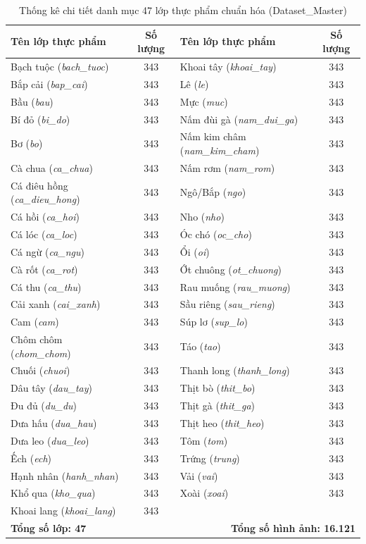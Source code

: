 \begin{table}[htbp]
\centering
\caption{Thống kê chi tiết danh mục 47 lớp thực phẩm chuẩn hóa (Dataset\_Master)}
\label{tab:dataset_distribution}
\footnotesize
\renewcommand{\arraystretch}{1.15}
\begin{tabularx}{\textwidth}{|X|c||X|c|}
\hline
\textbf{Tên lớp thực phẩm} & \textbf{Số lượng} & \textbf{Tên lớp thực phẩm} & \textbf{Số lượng} \\
\hline
Bạch tuộc (\textit{bach\_tuoc}) & 343 & Khoai tây (\textit{khoai\_tay}) & 343 \\
Bắp cải (\textit{bap\_cai}) & 343 & Lê (\textit{le}) & 343 \\
Bầu (\textit{bau}) & 343 & Mực (\textit{muc}) & 343 \\
Bí đỏ (\textit{bi\_do}) & 343 & Nấm đùi gà (\textit{nam\_dui\_ga}) & 343 \\
Bơ (\textit{bo}) & 343 & Nấm kim châm (\textit{nam\_kim\_cham}) & 343 \\
Cà chua (\textit{ca\_chua}) & 343 & Nấm rơm (\textit{nam\_rom}) & 343 \\
Cá điêu hồng (\textit{ca\_dieu\_hong}) & 343 & Ngô/Bắp (\textit{ngo}) & 343 \\
Cá hồi (\textit{ca\_hoi}) & 343 & Nho (\textit{nho}) & 343 \\
Cá lóc (\textit{ca\_loc}) & 343 & Óc chó (\textit{oc\_cho}) & 343 \\
Cá ngừ (\textit{ca\_ngu}) & 343 & Ổi (\textit{oi}) & 343 \\
Cà rốt (\textit{ca\_rot}) & 343 & Ớt chuông (\textit{ot\_chuong}) & 343 \\
Cá thu (\textit{ca\_thu}) & 343 & Rau muống (\textit{rau\_muong}) & 343 \\
Cải xanh (\textit{cai\_xanh}) & 343 & Sầu riêng (\textit{sau\_rieng}) & 343 \\
Cam (\textit{cam}) & 343 & Súp lơ (\textit{sup\_lo}) & 343 \\
Chôm chôm (\textit{chom\_chom}) & 343 & Táo (\textit{tao}) & 343 \\
Chuối (\textit{chuoi}) & 343 & Thanh long (\textit{thanh\_long}) & 343 \\
Dâu tây (\textit{dau\_tay}) & 343 & Thịt bò (\textit{thit\_bo}) & 343 \\
Đu đủ (\textit{du\_du}) & 343 & Thịt gà (\textit{thit\_ga}) & 343 \\
Dưa hấu (\textit{dua\_hau}) & 343 & Thịt heo (\textit{thit\_heo}) & 343 \\
Dưa leo (\textit{dua\_leo}) & 343 & Tôm (\textit{tom}) & 343 \\
Ếch (\textit{ech}) & 343 & Trứng (\textit{trung}) & 343 \\
Hạnh nhân (\textit{hanh\_nhan}) & 343 & Vải (\textit{vai}) & 343 \\
Khổ qua (\textit{kho\_qua}) & 343 & Xoài (\textit{xoai}) & 343 \\
Khoai lang (\textit{khoai\_lang}) & 343 & & \\
\hline
\multicolumn{2}{|l|}{\textbf{Tổng số lớp: 47}} & \multicolumn{2}{r|}{\textbf{Tổng số hình ảnh: 16.121}} \\
\hline
\end{tabularx}
\end{table}

